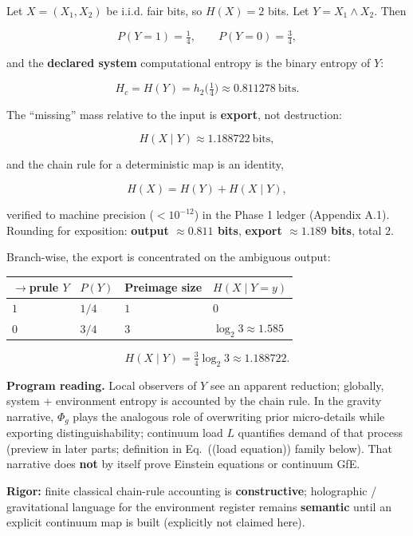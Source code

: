 \documentclass[
  11pt,
]{article}
\newcounter{none} %
\begin{document}
Let \(X=(X_1,X_2)\) be i.i.d. fair bits, so \(H(X)=2\) bits. Let \(Y=X_1\land X_2\). Then

\[
P(Y=1)=\tfrac14,\qquad P(Y=0)=\tfrac34,
\]

and the \textbf{declared system} computational entropy is the binary entropy of \(Y\):

\[
H_c = H(Y) = h_2\bigl(\tfrac14\bigr)\approx 0.811278\ \mathrm{bits}.
\]

The ``missing'' mass relative to the input is \textbf{export}, not destruction:

\[
H(X\mid Y)\approx 1.188722\ \mathrm{bits},
\]

and the chain rule for a deterministic map is an identity,

\[
H(X)=H(Y)+H(X\mid Y),
\]

verified to machine precision (\(<10^{-12}\)) in the Phase 1 ledger (Appendix A.1). Rounding for exposition: \textbf{output \(\approx 0.811\) bits}, \textbf{export \(\approx 1.189\) bits}, total \(2\).

Branch-wise, the export is concentrated on the ambiguous output:

{\def\LTcaptype{none} %
\begin{longtable}[]{@{}llll@{}}
$\rightarrow$prule\noalign{}
\(Y\) & \(P(Y)\) & Preimage size & \(H(X\mid Y=y)\) \\
\midrule\noalign{}
\endhead
\bottomrule\noalign{}
\endlastfoot
\(1\) & \(1/4\) & \(1\) & \(0\) \\
\(0\) & \(3/4\) & \(3\) & \(\log_2 3\approx 1.585\) \\
\end{longtable}
}

\[
H(X\mid Y)=\tfrac34\log_2 3\approx 1.188722.
\]

\textbf{Program reading.} Local observers of \(Y\) see an apparent reduction; globally, system + environment entropy is accounted by the chain rule. In the gravity narrative, \(\Phi_g\) plays the analogous role of overwriting prior micro-details while exporting distinguishability; continuum load \(L\) quantifies demand of that process (preview in later parts; definition in Eq.~((load equation)) family below). That narrative does \textbf{not} by itself prove Einstein equations or continuum GfE.

\textbf{Rigor:} finite classical chain-rule accounting is \textbf{constructive}; holographic / gravitational language for the environment register remains \textbf{semantic} until an explicit continuum map is built (explicitly not claimed here).
\end{document}
